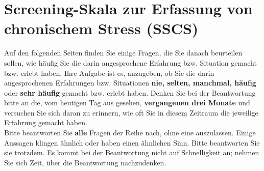 \setcounter{section}{14}
\section{Screening-Skala zur Erfassung von chronischem Stress (SSCS)}  
\vspace{3ex}
Auf den folgenden Seiten finden Sie einige Fragen, die Sie danach beurteilen sollen, wie häufig Sie die darin angesprochene Erfahrung bzw. Situation gemacht bzw. erlebt haben. Ihre Aufgabe ist es, anzugeben, ob Sie die darin angesprochenen Erfahrungen bzw. Situationen \textbf{nie, selten, manchmal, häufig} oder \textbf{sehr häufig} gemacht bzw. erlebt haben. Denken Sie bei der Beantwortung bitte an die, vom heutigen Tag aus gesehen, \textbf{vergangenen drei Monate} und versuchen Sie sich daran zu erinnern, wie oft Sie in diesem Zeitraum die jeweilige Erfahrung gemacht haben. \\

Bitte beantworten Sie \textbf{alle} Fragen der Reihe nach, ohne eine auszulassen. Einige Aussagen klingen ähnlich oder haben einen ähnlichen Sinn. Bitte beantworten Sie sie trotzdem. Es kommt bei der Beantwortung nicht auf Schnelligkeit an; nehmen Sie sich Zeit, über die Beantwortung nachzudenken.
    
